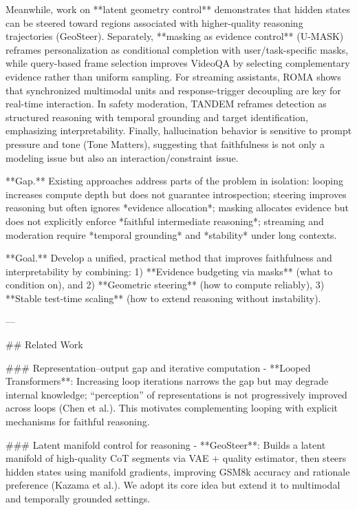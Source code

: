 Meanwhile, work on **latent geometry control** demonstrates that hidden states can be steered toward regions associated with higher-quality reasoning trajectories (GeoSteer). Separately, **masking as evidence control** (U-MASK) reframes personalization as conditional completion with user/task-specific masks, while query-based frame selection improves VideoQA by selecting complementary evidence rather than uniform sampling. For streaming assistants, ROMA shows that synchronized multimodal units and response-trigger decoupling are key for real-time interaction. In safety moderation, TANDEM reframes detection as structured reasoning with temporal grounding and target identification, emphasizing interpretability. Finally, hallucination behavior is sensitive to prompt pressure and tone (Tone Matters), suggesting that faithfulness is not only a modeling issue but also an interaction/constraint issue.

**Gap.** Existing approaches address parts of the problem in isolation: looping increases compute depth but does not guarantee introspection; steering improves reasoning but often ignores *evidence allocation*; masking allocates evidence but does not explicitly enforce *faithful intermediate reasoning*; streaming and moderation require *temporal grounding* and *stability* under long contexts.

**Goal.** Develop a unified, practical method that improves faithfulness and interpretability by combining:  
1) **Evidence budgeting via masks** (what to condition on), and  
2) **Geometric steering** (how to compute reliably),  
3) **Stable test-time scaling** (how to extend reasoning without instability).

---

## Related Work  

### Representation–output gap and iterative computation  
- **Looped Transformers**: Increasing loop iterations narrows the gap but may degrade internal knowledge; “perception” of representations is not progressively improved across loops (Chen et al.). This motivates complementing looping with explicit mechanisms for faithful reasoning.

### Latent manifold control for reasoning  
- **GeoSteer**: Builds a latent manifold of high-quality CoT segments via VAE + quality estimator, then steers hidden states using manifold gradients, improving GSM8k accuracy and rationale preference (Kazama et al.). We adopt its core idea but extend it to multimodal and temporally grounded settings.

